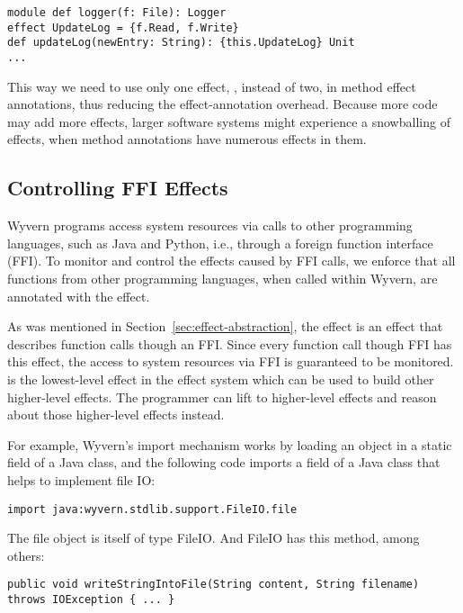 \begin{minipage}{\linewidth}
\begin{lstlisting}[xleftmargin=-5pt, numbers=none]
module def logger(f: File): Logger
effect UpdateLog = {f.Read, f.Write}
def updateLog(newEntry: String): {this.UpdateLog} Unit
...
\end{lstlisting}
\end{minipage}
This way we need to use only one effect, , instead of two, in method effect annotations, thus reducing the effect-annotation overhead. Because more code may add more effects, larger software systems might experience a snowballing of effects, when method annotations have numerous effects in them.


\subsection{Controlling FFI Effects}
Wyvern programs access system resources via calls to other programming languages, such as Java and Python, i.e., through a foreign function interface (FFI). To monitor and control the effects caused by FFI calls, we enforce that all functions from other programming languages, when called within Wyvern, are annotated with the  effect. 

As was mentioned in Section~\ref{sec:effect-abstraction}, the  effect is an effect that describes function calls though an FFI. Since every function call though FFI has this effect, the access to system resources via FFI is guaranteed to be monitored.  is the lowest-level effect in the effect system which can be used to build other higher-level effects. The programmer can lift  to higher-level effects and reason about those higher-level effects instead.


For example, Wyvern’s import mechanism works by loading an object in a static field of a Java class, and the following code imports a field of a Java class that helps to implement file IO:\\
\begin{minipage}{\linewidth}
\begin{lstlisting}[xleftmargin=-5pt, numbers=none]
  import java:wyvern.stdlib.support.FileIO.file
\end{lstlisting}
\end{minipage}

The file object is itself of type FileIO. And FileIO has this method, among others: \\
\begin{minipage}{\linewidth}
\begin{lstlisting}[xleftmargin=3pt, numbers=none]
public void writeStringIntoFile(String content, String filename) throws IOException { ... }
\end{lstlisting}
\end{minipage}

